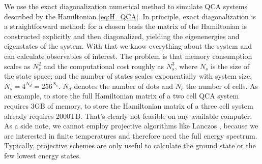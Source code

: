 We use the exact diagonalization numerical method \cite{Fehske} to simulate QCA
systems described by the Hamiltonian \eqref{eq:H_QCA}. In principle, exact
diagonalization is a straightforward method: for a chosen basis the matrix of
the Hamiltonian is constructed explicitly and then diagonalized, yielding the
eigenenergies and eigenstates of the system. With that we know everything about
the system and can calculate observables of interest. The problem is that memory
consumption scales as $N_s^2$ and the computational cost roughly as $N_s^3$,
where $N_s$ is the size of the state space; and the number of states scales
exponentially with system size, $N_s = 4^{N_d} = 256^{N_c}$. $N_d$ denotes the
number of dots and $N_c$ the number of cells. As an example, to store the full
Hamiltonian matrix of a two cell QCA system requires 3GB of memory, to store the
Hamiltonian matrix of a three cell system already requires 2000TB. That's
clearly not feasible on any available computer. As a side note, we cannot employ
projective algorithms like Lanczos \cite{Fehske}, because we are interested in
finite temperatures and therefore need the full energy spectrum. Typically,
projective schemes are only useful to calculate the ground state or the few
lowest energy states. 

